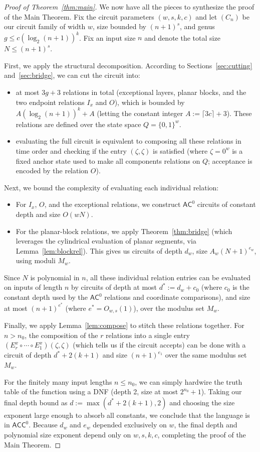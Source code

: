 \documentclass[11pt]{article}
\theoremstyle{definition}
\theoremstyle{remark}
\newcommand{\ACC}{\mathsf{ACC}^0}
\newcommand{\AC}{\mathsf{AC}^0}
\newcommand{\comp}{\circ}
\begin{document}
\begin{proof}[Proof of Theorem~\ref{thm:main}]
We now have all the pieces to synthesize the proof of the Main Theorem. Fix the circuit parameters $(w,s,k,c)$ and let $(C_n)$ be our circuit family of width $w$, size bounded by $(n+1)^s$, and genus $g\le c(\log_2(n+1))^k$. Fix an input size $n$ and denote the total size $N\le(n+1)^s$.

First, we apply the structural decomposition. According to Sections~\ref{sec:cutting} and~\ref{sec:bridge}, we can cut the circuit into:
\begin{itemize}
\item at most $3g+3$ relations in total (exceptional layers, planar blocks, and the two endpoint relations $I_x$ and $O$), which is bounded by $A(\log_2(n+1))^{k}+A$ (letting the constant integer $A:=\lceil 3c\rceil+3$). These relations are defined over the state space $Q=\{0,1\}^{w}$.
\item evaluating the full circuit is equivalent to composing all these relations in time order and checking if the entry $(\zeta,\zeta)$ is satisfied (where $\zeta = 0^w$ is a fixed anchor state used to make all components relations on $Q$; acceptance is encoded by the relation $O$).
\end{itemize}

Next, we bound the complexity of evaluating each individual relation:
\begin{itemize}
\item For $I_x$, $O$, and the exceptional relations, we construct $\AC$ circuits of constant depth and size $O(wN)$.
\item For the planar-block relations, we apply Theorem~\ref{thm:bridge} (which leverages the cylindrical evaluation of planar segments, via Lemma~\ref{lem:blockrel}). This gives us circuits of depth $d_w$, size $A_w(N+1)^{e_w}$, using moduli $M_w$.
\end{itemize}
Since $N$ is polynomial in $n$, all these individual relation entries can be evaluated on inputs of length $n$ by circuits of depth at most $d^\ast := d_w + c_0$ (where $c_0$ is the constant depth used by the $\AC$ relations and coordinate comparisons), and size at most $(n+1)^{e^\ast}$ (where $e^\ast=O_{w,s}(1)$), over the modulus set $M_w$.

Finally, we apply Lemma~\ref{lem:compose} to stitch these relations together. For $n>n_0$, the composition of the $r$ relations into a single entry $(E^x_r\comp\cdots\comp E^x_1)(\zeta,\zeta)$ (which tells us if the circuit accepts) can be done with a circuit of depth $d^\ast+2(k+1)$ and size $(n+1)^{e_1}$ over the same modulus set $M_w$.

For the finitely many input lengths $n\le n_0$, we can simply hardwire the truth table of the function using a DNF (depth 2, size at most $2^{n_0}+1$). Taking our final depth bound as $d:=\max(d^\ast+2(k+1),2)$ and choosing the size exponent large enough to absorb all constants, we conclude that the language is in $\ACC$. Because $d_w$ and $e_w$ depended exclusively on $w$, the final depth and polynomial size exponent depend only on $w,s,k,c$, completing the proof of the Main Theorem.
\end{proof}
\end{document}
